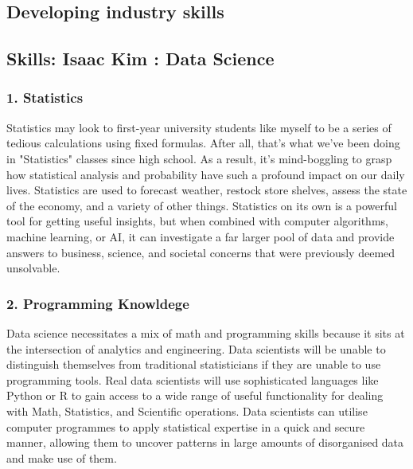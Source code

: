 \documentclass[a4paper, 11pt]{report}
\begin{document}
\subsection{Developing industry skills}


\subsection{Skills: Isaac Kim : Data Science}
    \subsubsection{1. Statistics}
    Statistics may look to first-year university students like myself to be a series of tedious calculations using fixed formulas. After all, that's what we've been doing in "Statistics" classes since high school. As a result, it's mind-boggling to grasp how statistical analysis and probability have such a profound impact on our daily lives. Statistics are used to forecast weather, restock store shelves, assess the state of the economy, and a variety of other things.\cite{isaac1} Statistics on its own is a powerful tool for getting useful insights, but when combined with computer algorithms, machine learning, or AI, it can investigate a far larger pool of data and provide answers to business, science, and societal concerns that were previously deemed unsolvable.\cite{isaac2}

    \subsubsection{2. Programming Knowldege}
    Data science necessitates a mix of math and programming skills because it sits at the intersection of analytics and engineering. Data scientists will be unable to distinguish themselves from traditional statisticians if they are unable to use programming tools. Real data scientists will use sophisticated languages like Python or R to gain access to a wide range of useful functionality for dealing with Math, Statistics, and Scientific operations.\cite{isaac3} Data scientists can utilise computer programmes to apply statistical expertise in a quick and secure manner, allowing them to uncover patterns in large amounts of disorganised data and make use of them.\cite{isaac1}
\end{document}
